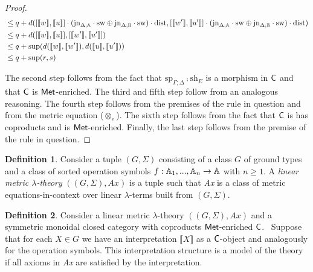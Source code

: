 \documentclass[10pt,a4paper]{amsart}
\theoremstyle{definition}
\newtheorem{definition}{Definition}[section]
\theoremstyle{definition}
\theoremstyle{definition}
\theoremstyle{definition}
\theoremstyle{definition}
\theoremstyle{definition}
\begin{document}
\begin{proof}
\begin{align*}
    & \leq q +  d( [\llbracket w\rrbracket ,\llbracket u\rrbracket] \cdot (\text{jn}_{\Delta;\mathbb{A}}\cdot \mathrm{sw} \oplus \text{jn}_{\Delta;\mathbb{B}}\cdot \mathrm{sw}) \cdot \mathrm{dist},  [\llbracket w'\rrbracket ,\llbracket u'\rrbracket] \cdot (\text{jn}_{\Delta;\mathbb{A}}\cdot \mathrm{sw} \oplus \text{jn}_{\Delta;\mathbb{B}}\cdot \mathrm{sw}) \cdot \mathrm{dist}) \\
    & \leq q +  d( [\llbracket w\rrbracket ,\llbracket u\rrbracket],  [\llbracket w'\rrbracket ,\llbracket u'\rrbracket]) \\
    & \leq q + \sup(d( \llbracket w\rrbracket , \llbracket w' \rrbracket), d( \llbracket u\rrbracket , \llbracket u' \rrbracket)) \\
    & \leq q + \sup(r, s) \\
  \end{align*}
  
  The second step follows from the fact that $\text{sp}_{\Gamma;\Delta} \comp \text{sh}_{E}$  is a morphism in $\mathsf{C}$  and that $\mathsf{C}$ is $\mathsf{Met}$-enriched.  The third and fifth step follow from an analogous reasoning. The fourth step follows from  the premises of the rule in question and from the metric equation ($\otimes_e$). The sixth step follows from the fact that $\mathsf{C}$ is has coproducts and is $\mathsf{Met}$-enriched. Finally, the last step follows from the premise of the rule in question.

\end{proof}

\begin{definition}
Consider a tuple $(G,\Sigma)$ consisting of a class $G$ of ground
 types and a class of sorted operation symbols $f : \mathbb{A}_1,...,\mathbb{A}_n \rightarrow \mathbb{A}$ with $n \geq 1$. A \emph{linear metric $\lambda$-theory} $((G,\Sigma),\textit{Ax})$ is a tuple such that \textit{Ax} is a class of metric equations-in-context over linear $\lambda$-terms built from $(G,\Sigma)$.
\end{definition}

\begin{definition}
  Consider a linear metric $\lambda$-theory $((G,\Sigma),\textit{Ax})$ and a symmetric monoidal closed category with coproducts $\mathsf{Met}$-enriched $\mathsf{C}$.  Suppose that for each $X \in G$ we have an interpretation $\llbracket X \rrbracket$ as a $\mathsf{C}$-object and analogously for the operation symbols. This interpretation structure is a model of the theory if all axioms in \textit{Ax} are satisfied by the interpretation.
\end{definition}
\end{document}
